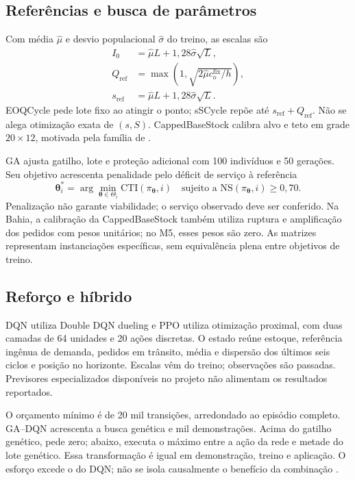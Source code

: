 \subsection{Referências e busca de parâmetros}
\label{sec:sinais_previsao}\label{sec:redundancia_portfolio}
Com média $\hat\mu$ e desvio populacional $\hat\sigma$ do treino, as escalas são
\begin{align}
 I_0&=\hat\mu L+1{,}28\hat\sigma\sqrt L,\label{eq:I0_metod}\\
 Q_{\mathrm{ref}}&=\max(1,\sqrt{2\hat\mu c_o^{\mathrm{fix}}/h}),\label{eq:qref_metod}\\
 s_{\mathrm{ref}}&=\hat\mu L+1{,}28\hat\sigma\sqrt L.\label{eq:sref_metod}
\end{align}
EOQCycle pede lote fixo ao atingir o ponto; sSCycle repõe até $s_{\mathrm{ref}}+Q_{\mathrm{ref}}$. Não se alega otimização exata de $(s,S)$. CappedBaseStock calibra alvo e teto em grade $20\times12$, motivada pela família de \citet{Xin2021CappedBaseStock}.

GA ajusta gatilho, lote e proteção adicional com 100 indivíduos e 50 gerações. Seu objetivo acrescenta penalidade pelo déficit de serviço à referência
\begin{equation}
 \boldsymbol\theta_i^*=\arg\min_{\boldsymbol\theta\in\Theta_i}\mathrm{CTI}(\pi_{\boldsymbol\theta},i)
 \quad\text{sujeito a }\mathrm{NS}(\pi_{\boldsymbol\theta},i)\geq0{,}70.
 \label{eq:obj_metaheuristicas}
\end{equation}
Penalização não garante viabilidade; o serviço observado deve ser conferido. Na Bahia, a calibração da CappedBaseStock também utiliza ruptura e amplificação dos pedidos com pesos unitários; no M5, esses pesos são zero. As matrizes representam instanciações específicas, sem equivalência plena entre objetivos de treino.

\subsection{Reforço e híbrido}
DQN utiliza Double DQN dueling e PPO utiliza otimização proximal, com duas camadas de 64 unidades e 20 ações discretas. O estado reúne estoque, referência ingênua de demanda, pedidos em trânsito, média e dispersão dos últimos seis ciclos e posição no horizonte. Escalas vêm do treino; observações são passadas. Previsores especializados disponíveis no projeto não alimentam os resultados reportados.

O orçamento mínimo é de 20 mil transições, arredondado ao episódio completo. GA--DQN acrescenta a busca genética e mil demonstrações. Acima do gatilho genético, pede zero; abaixo, executa o máximo entre a ação da rede e metade do lote genético. Essa transformação é igual em demonstração, treino e aplicação. O esforço excede o do DQN; não se isola causalmente o benefício da combinação \citep{Zabraoui2025GaDQN}.

